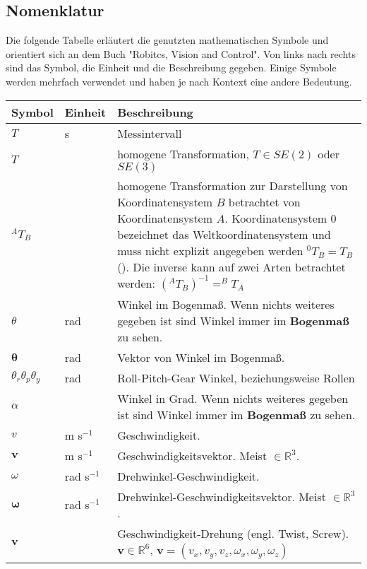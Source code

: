 \subsection{Nomenklatur}
\label{sec:basic-math}
    
  Die folgende Tabelle erläutert die genutzten mathematischen Symbole und orientiert sich an dem Buch "Robitcs, Vision and Control". Von links nach rechts sind das Symbol, die Einheit und die Beschreibung gegeben. Einige Symbole werden mehrfach verwendet und haben je nach Kontext eine andere Bedeutung.

  \begin{table}[h]%
  \begin{tabularx}{\columnwidth}{|l|l|X|}
  	\hline Symbol & Einheit & Beschreibung \\ 
  	\hline $T$ & s & Messintervall \\
 	\hline $T$ &  & homogene Transformation, $T \in SE(2)$ oder $SE(3)$ \\
 	\hline $^AT_B$ &  & homogene Transformation zur Darstellung von Koordinatensystem $ B $ betrachtet von Koordinatensystem $ A $. Koordinatensystem $ 0 $ bezeichnet das Weltkoordinatensystem und muss nicht explizit angegeben werden $^0T_B = T_B$(). Die inverse kann auf zwei Arten betrachtet werden: $(^AT_B)^{-1} = ^BT_A $ \\
 	\hline $\theta$ & rad & Winkel im Bogenmaß. Wenn nichts weiteres gegeben ist sind Winkel immer im \textbf{Bogenmaß} zu sehen. \\ 
 	\hline $ \pmb{\theta}$ & rad & Vektor von Winkel im Bogenmaß. \\ 
	\hline $\theta_r \theta_p \theta_y$ & rad & Roll-Pitch-Gear Winkel, beziehungsweise Rollen \\
 	\hline $\alpha$ & \textdegree & Winkel in Grad. Wenn nichts weiteres gegeben ist sind Winkel immer im \textbf{Bogenmaß} zu sehen. \\
 	\hline $v$ & m s$^{-1}$ & Geschwindigkeit. \\
 	\hline $\pmb{v}$ &  m s$^{-1}$  & Geschwindigkeitsvektor. Meist $\in \mathds{R}^3$. \\
 	\hline $\omega$ & rad s$^{-1}$ & Drehwinkel-Geschwindigkeit. \\
 	\hline $\pmb{\omega}$ &  rad s$^{-1}$  & Drehwinkel-Geschwindigkeitsvektor. Meist $\in \mathds{R}^3$. \\
 	\hline $\pmb{v}$ &  & Geschwindigkeit-Drehung (engl. Twist, Screw).  $\pmb{v} \in \mathds{R}^6$, $\pmb{v} = (v_x, v_y, v_z,\omega_x, \omega_y, \omega_z)$ \\

\end{tabularx}
\end{table}

